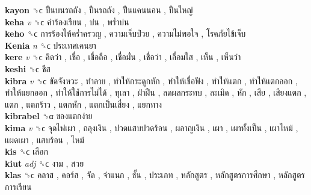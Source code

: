 \textbf{kayon} ␝ϲ   ปืนบนรถถัง ,  ปืนรถถัง ,  ปืนแคนนอน ,  ปืนใหญ่   \\
\textbf{keha} \emph{v}  ␝ϲ   คำร้องเรียน ,  บ่น ,  พร่ำบ่น   \\
\textbf{keho} ␝ϲ   การร้องไห้คร่ำครวญ ,  ความเจ็บป่วย ,  ความไม่พอใจ ,  โรคภัยไข้เจ็บ   \\
\textbf{Kenia} \emph{n}  ␝ϲ   ประเทศเคนยา   \\
\textbf{kere} \emph{v}  ␝ϲ   คิดว่า ,  เชื่อ ,  เชื่อถือ ,  เชื่อมั่น ,  เชื่อว่า ,  เลื่อมใส ,  เห็น ,  เห็นว่า   \\
\textbf{keshi} ␝ϲ   ชีส   \\
\textbf{kibra} \emph{v}  ␝ϲ   ขัดจังหวะ ,  ทำลาย ,  ทำให้กระดูกหัก ,  ทำให้เชื่อฟัง ,  ทำให้แตก ,  ทำให้แตกออก ,  ทำให้แยกออก ,  ทำให้ใช้การไม่ได้ ,  ทุเลา ,  ฝ่าฝืน ,  ลดผลกระทบ ,  ละเมิด ,  หัก ,  เสีย ,  เสียงแตก ,  แตก ,  แตกร้าว ,  แตกหัก ,  แตกเป็นเสี่ยง ,  แยกทาง   \\
\textbf{kibrabel} ␝α   ของแตกง่าย   \\
\textbf{kima} \emph{v}  ␝ϲ   จุดไฟเผา ,  ถลุงเงิน ,  ปวดแสบปวดร้อน ,  ผลาญเงิน ,  เผา ,  เผาทั้งเป็น ,  เผาไหม้ ,  แผดเผา ,  แสบร้อน ,  ไหม้   \\
\textbf{kis} ␝ϲ   เลือก   \\
\textbf{kiut} \emph{adj}  ␝ϲ   งาม ,  สวย   \\
\textbf{klas} ␝ϲ   คลาส ,  คอร์ส ,  จัด ,  จำแนก ,  ชั้น ,  ประเภท ,  หลักสูตร ,  หลักสูตรการศึกษา ,  หลักสูตรการเรียน   \\
